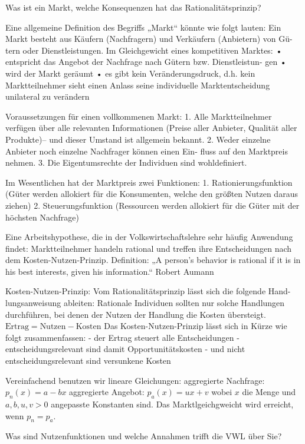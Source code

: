 Was ist ein Markt, welche Konsequenzen hat das Rationalitätsprinzip?

Eine allgemeine Definition des Begriffs „Markt“ könnte wie folgt lauten: Ein
Markt besteht aus Käufern (Nachfragern) und Verkäufern (Anbietern) von Gü-
tern oder Dienstleistungen.
Im Gleichgewicht eines kompetitiven Marktes:
• entspricht das Angebot der Nachfrage nach Gütern bzw. Dienstleistun-
gen
• wird der Markt geräumt
• es gibt kein Veränderungsdruck, d.h. kein Marktteilnehmer sieht einen
Anlass seine individuelle Marktentscheidung unilateral zu verändern

Voraussetzungen für einen vollkommenen Markt:
1. Alle Marktteilnehmer verfügen über alle relevanten Informationen
(Preise aller Anbieter, Qualität aller Produkte)– und dieser Umstand
ist allgemein bekannt.
2. Weder einzelne Anbieter noch einzelne Nachfrager können einen Ein-
fluss auf den Marktpreis nehmen.
3. Die Eigentumsrechte der Individuen sind wohldefiniert.

Im Wesentlichen hat der Marktpreis zwei Funktionen:
1. Rationierungsfunktion (Güter werden allokiert für die Konsumenten, welche den größten Nutzen daraus ziehen)
2. Steuerungsfunktion (Ressourcen werden allokiert für die Güter mit der höchsten Nachfrage)

Eine Arbeitshypothese, die in der Volkswirtschaftslehre sehr häufig Anwendung
findet: Marktteilnehmer handeln rational und treffen ihre Entscheidungen nach
dem Kosten-Nutzen-Prinzip.
Definition: „A person’s behavior is rational if it is in his best interests, given
his information.“ Robert Aumann

Kosten-Nutzen-Prinzip: Vom Rationalitätsprinzip lässt sich die folgende Hand-
lungsanweisung ableiten:
Rationale Individuen sollten nur solche Handlungen
durchführen, bei denen der Nutzen der Handlung die Kosten übersteigt.
\( \text{Ertrag} = \text{Nutzen} - \text{Kosten} \)
Das Kosten-Nutzen-Prinzip lässt sich in Kürze wie folgt zusammenfassen:
- der Ertrag steuert alle Entscheidungen
- entscheidungsrelevant sind damit Opportunitätskosten
- und nicht entscheidungsrelevant sind versunkene Kosten

Vereinfachend benutzen wir lineare Gleichungen:
aggregierte Nachfrage: \( p_n(x) = a - bx \)
aggregierte Angebot: \( p_a(x) = ux + v \)
wobei \( x \) die Menge und \( a,b,u,v > 0\) angepasste Konstanten sind.
Das Marktlgeichgweicht wird erreicht, wenn \( p_n = p_a \).


Was sind Nutzenfunktionen und welche Annahmen trifft die VWL über Sie?

